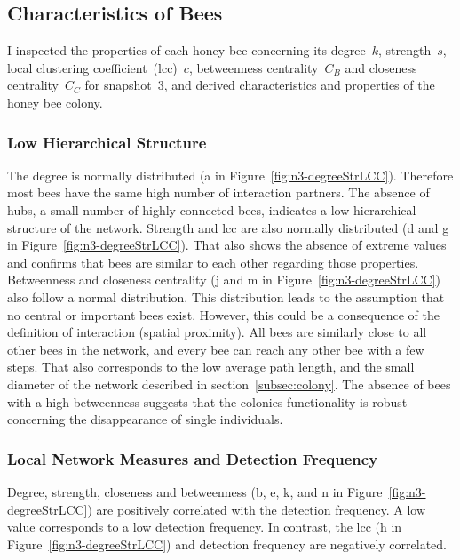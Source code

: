 \subsection{Characteristics of Bees}
\label{subsubsec:bees}
I inspected the properties of each honey bee concerning its degree~$k$, strength~$s$, local clustering coefficient~(lcc)~$c$, betweenness centrality~$C_B$ and closeness centrality~$C_C$ for snapshot~3, and derived characteristics and properties of the honey bee colony.

\subsubsection{Low Hierarchical Structure}
The degree is normally distributed (a in Figure~\ref{fig:n3-degreeStrLCC}).
Therefore most bees have the same high number of interaction partners.
The absence of hubs, a small number of highly connected bees, indicates a low hierarchical structure of the network.
Strength and lcc are also normally distributed (d and g in Figure~\ref{fig:n3-degreeStrLCC}).
That also shows the absence of extreme values and confirms that bees are similar to each other regarding those properties.
Betweenness and closeness centrality (j and m in Figure~\ref{fig:n3-degreeStrLCC}) also follow a normal distribution.
This distribution leads to the assumption that no central or important bees exist. However, this could be a consequence of the definition of interaction (spatial proximity).
All bees are similarly close to all other bees in the network, and every bee can reach any other bee with a few steps.
That also corresponds to the low average path length, and the small diameter of the network described in section~\ref{subsec:colony}.
The absence of bees with a high betweenness suggests that the colonies functionality is robust concerning the disappearance of single individuals.

\subsubsection{Local Network Measures and Detection Frequency}
Degree, strength, closeness and betweenness (b, e, k, and n in Figure~\ref{fig:n3-degreeStrLCC}) are positively correlated with the detection frequency. A low value corresponds to a low detection frequency. In contrast, the lcc (h in Figure~\ref{fig:n3-degreeStrLCC}) and detection frequency are negatively correlated.

